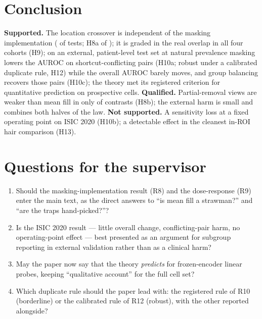 \section{Conclusion}
\textbf{Supported.} The location crossover is independent of the masking implementation (\sSevenNPrimOK{} of \sSevenNPrim{} tests; H8a \sSevenHEightaN{} of \sSevenHEightaOf); it is
graded in the real overlap in all four cohorts (H9); on an external, patient-level test set at natural prevalence
masking lowers the AUROC on shortcut-conflicting pairs (H10a; robust under a calibrated duplicate rule, H12) while the
overall AUROC barely moves, and group balancing recovers those pairs (H10c); the theory met its registered criterion for
quantitative prediction on \sSevenTN{} prospective cells. \textbf{Qualified.} Partial-removal views are weaker than mean
fill in only \sSevenHEightbConN{} of \sSevenHEightbConOf{} contrasts (H8b); the external harm is small and combines both halves
of the law. \textbf{Not supported.} A sensitivity loss at a fixed operating point on ISIC 2020 (H10b); a detectable effect
in the cleanest in-ROI hair comparison (H13).

\section{Questions for the supervisor}
\begin{enumerate}\itemsep1pt
\item Should the masking-implementation result (R8) and the dose-response (R9) enter the main text, as the direct answers
to ``is mean fill a strawman?'' and ``are the traps hand-picked?''?
\item Is the ISIC 2020 result --- little overall change, conflicting-pair harm, no operating-point effect --- best presented
as an argument for subgroup reporting in external validation rather than as a clinical harm?
\item May the paper now say that the theory \emph{predicts} for frozen-encoder linear probes, keeping ``qualitative
account'' for the full cell set?
\item Which duplicate rule should the paper lead with: the registered rule of R10 (borderline) or the calibrated rule of
R12 (robust), with the other reported alongside?
\end{enumerate}




